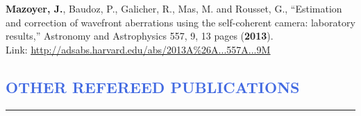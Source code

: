 \documentclass[12pt]{article}
\begin{document}
\begin{etaremune}
\item \textbf{Mazoyer, J.}, Baudoz, P., Galicher, R., Mas, M. and Rousset, G., “Estimation and correction of wavefront aberrations using the self-coherent camera: laboratory results,” Astronomy and Astrophysics 557, 9, 13 pages (\textbf{2013}).\\
Link: \textcolor{BrickRed}{\underline{\url{http://adsabs.harvard.edu/abs/2013A\%26A...557A...9M}}}
\end{etaremune}

\vspace{-0.8cm}
\textcolor{RoyalBlue}{\section{\large OTHER REFEREED PUBLICATIONS}
\vspace{-0.35cm}\hrule}
\vspace{0.3cm}
\end{document}

